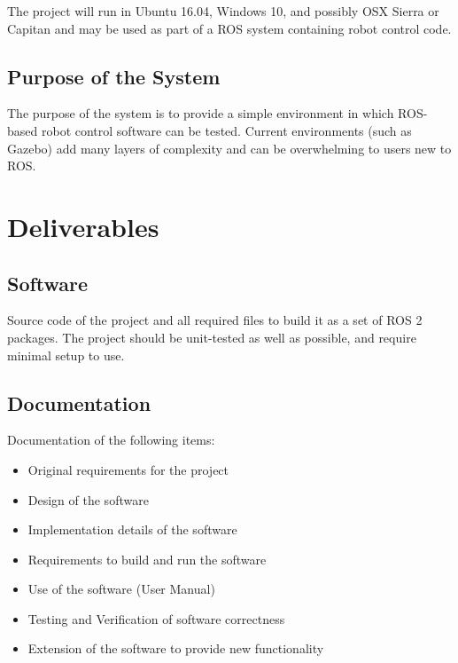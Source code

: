 The project will run in Ubuntu 16.04, Windows 10, and possibly OSX Sierra or Capitan and may be used as part of a ROS system containing robot control code.

\subsection{Purpose of the System}
The purpose of the system is to provide a simple environment in which ROS-based robot control software can be tested. Current environments (such as Gazebo) add many layers of complexity and can be overwhelming to users new to ROS.

\section{Deliverables}

\subsection{Software}
Source code of the project and all required files to build it as a set of ROS 2 packages. The project should be unit-tested as well as possible, and require minimal setup to use. 

\subsection{Documentation}
Documentation of the following items:
\begin{itemize}
	\item Original requirements for the project
	\item Design of the software
	\item Implementation details of the software
	\item Requirements to build and run the software
	\item Use of the software (User Manual)
	\item Testing and Verification of software correctness
	\item Extension of the software to provide new functionality
\end{itemize}
